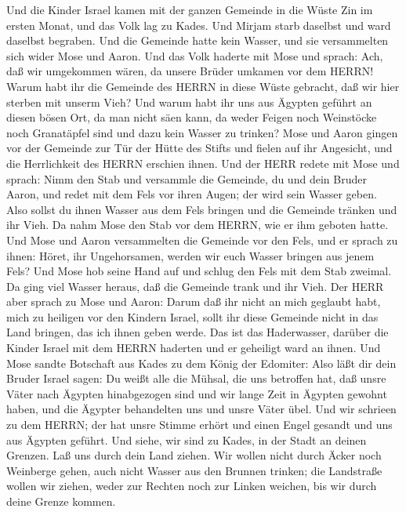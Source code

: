  Und die Kinder Israel kamen mit der ganzen Gemeinde in die
Wüste Zin im ersten Monat, und das Volk lag zu Kades. Und Mirjam starb
daselbst und ward daselbst begraben.  Und die Gemeinde hatte
kein Wasser, und sie versammelten sich wider Mose und Aaron.
 Und das Volk haderte mit Mose und sprach: Ach, daß wir
umgekommen wären, da unsere Brüder umkamen vor dem HERRN! 
Warum habt ihr die Gemeinde des HERRN in diese Wüste gebracht, daß wir
hier sterben mit unserm Vieh?  Und warum habt ihr uns aus
Ägypten geführt an diesen bösen Ort, da man nicht säen kann, da weder
Feigen noch Weinstöcke noch Granatäpfel sind und dazu kein Wasser zu
trinken?  Mose und Aaron gingen vor der Gemeinde zur Tür der
Hütte des Stifts und fielen auf ihr Angesicht, und die Herrlichkeit des
HERRN erschien ihnen.  Und der HERR redete mit Mose und
sprach:  Nimm den Stab und versammle die Gemeinde, du und
dein Bruder Aaron, und redet mit dem Fels vor ihren Augen; der wird sein
Wasser geben. Also sollst du ihnen Wasser aus dem Fels bringen und die
Gemeinde tränken und ihr Vieh.  Da nahm Mose den Stab vor
dem HERRN, wie er ihm geboten hatte.  Und Mose und Aaron
versammelten die Gemeinde vor den Fels, und er sprach zu ihnen: Höret,
ihr Ungehorsamen, werden wir euch Wasser bringen aus jenem Fels?
 Und Mose hob seine Hand auf und schlug den Fels mit dem
Stab zweimal. Da ging viel Wasser heraus, daß die Gemeinde trank und ihr
Vieh.  Der HERR aber sprach zu Mose und Aaron: Darum daß
ihr nicht an mich geglaubt habt, mich zu heiligen vor den Kindern
Israel, sollt ihr diese Gemeinde nicht in das Land bringen, das ich
ihnen geben werde.  Das ist das Haderwasser, darüber die
Kinder Israel mit dem HERRN haderten und er geheiligt ward an ihnen.
 Und Mose sandte Botschaft aus Kades zu dem König der
Edomiter: Also läßt dir dein Bruder Israel sagen: Du weißt alle die
Mühsal, die uns betroffen hat,  daß unsre Väter nach
Ägypten hinabgezogen sind und wir lange Zeit in Ägypten gewohnt haben,
und die Ägypter behandelten uns und unsre Väter übel.  Und
wir schrieen zu dem HERRN; der hat unsre Stimme erhört und einen Engel
gesandt und uns aus Ägypten geführt. Und siehe, wir sind zu Kades, in
der Stadt an deinen Grenzen.  Laß uns durch dein Land
ziehen. Wir wollen nicht durch Äcker noch Weinberge gehen, auch nicht
Wasser aus den Brunnen trinken; die Landstraße wollen wir ziehen, weder
zur Rechten noch zur Linken weichen, bis wir durch deine Grenze kommen.
